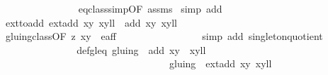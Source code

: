 \begin{isabellebody}
\ \ \ \ \ \ \ \ \ \ \ \ \ \ \isamarkupfalse%
\ eq{\isacharunderscore}class{\isacharunderscore}simp{\isacharbrackleft}OF\ assms{\isacharparenleft}{}{\isacharparenright}{\isacharbrackright}\ \isamarkupfalse%
{\isacharparenleft}simp\ add{\isacharcolon}\ {\isachardoublequoteopen}{}{\isachardoublequoteclose}{\isacharparenleft}{}{\isacharparenright}{\isacharparenright}\isanewline
\ \ \ \ \ \ \ \ \ \ \ \ \isamarkupfalse%
\ \isamarkupfalse%
\ ext{\isacharunderscore}to{\isacharunderscore}add{\isacharcolon}\ {\isachardoublequoteopen}{\isacharparenleft}ext{\isacharunderscore}add\ {\isacharparenleft}x{\isacharcomma}y{\isacharparenright}\ {\isacharparenleft}x{\isacharprime}{\isacharcomma}y{\isacharprime}{\isacharparenright}{\isacharcomma}l{\isacharplus}l{\isacharprime}{\isacharparenright}\ {\isacharequal}\ {\isacharparenleft}add\ {\isacharparenleft}x{\isacharcomma}y{\isacharparenright}\ {\isacharparenleft}x{\isacharprime}{\isacharcomma}y{\isacharprime}{\isacharparenright}{\isacharcomma}l{\isacharplus}l{\isacharprime}{\isacharparenright}{\isachardoublequoteclose}\ \isanewline
\ \ \ \ \ \ \ \ \ \ \ \ \ \ \isamarkupfalse%
\ gluing{\isacharunderscore}class{\isacharbrackleft}OF\ z{}\ {\isacartoucheopen}{\isacharparenleft}x{\isacharcomma}y{\isacharparenright}\ {\isasymin}\ e{\isacharunderscore}aff{\isacartoucheclose}{\isacharbrackright}\ \isanewline
\ \ \ \ \ \ \ \ \ \ \ \ \ \ \isamarkupfalse%
\ {\isacharparenleft}simp\ add{\isacharcolon}\ singleton{\isacharunderscore}quotient{\isacharparenright}\ \ \isanewline
\ \ \ \ \ \ \ \ \ \ \ \ \isamarkupfalse%
\ \isamarkupfalse%
\ def{\isacharunderscore}gl{\isacharunderscore}eq{\isacharcolon}\ {\isachardoublequoteopen}gluing\ {\isacharbackquote}{\isacharbackquote}\ {\isacharbraceleft}{\isacharparenleft}{\isacharparenleft}add\ {\isacharparenleft}x{\isacharcomma}y{\isacharparenright}\ {\isacharparenleft}{\isasymtau}\ {\isacharparenleft}x{\isacharprime}{\isacharcomma}y{\isacharprime}{\isacharparenright}{\isacharparenright}{\isacharparenright}{\isacharcomma}l{\isacharplus}l{\isacharprime}{\isacharplus}{}{\isacharparenright}{\isacharbraceright}\ {\isacharequal}\ \isanewline
\ \ \ \ \ \ \ \ \ \ \ \ \ \ \ \ \ \ \ \ \ \ \ \ \ \ \ \ \ \ \ \ \ \ gluing\ {\isacharbackquote}{\isacharbackquote}\ {\isacharbraceleft}{\isacharparenleft}ext{\isacharunderscore}add\ {\isacharparenleft}x{\isacharcomma}y{\isacharparenright}\ {\isacharparenleft}x{\isacharprime}{\isacharcomma}y{\isacharprime}{\isacharparenright}{\isacharcomma}l{\isacharplus}l{\isacharprime}{\isacharparenright}{\isacharbraceright}{\isachardoublequoteclose}\isanewline

\end{isabellebody}
